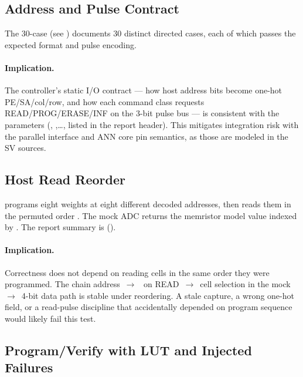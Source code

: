 \subsection{Address and Pulse Contract}
\label{sec:analysis-addr-contract}

The 30-case  (see
) documents 30 distinct directed cases, each
of which passes the expected  format and pulse
encoding.

\paragraph{Implication.}
The controller's static I/O contract --- how host address bits become
one-hot PE/SA/col/row, and how each command class requests
READ/PROG/ERASE/INF on the 3-bit pulse bus --- is consistent with the
 parameters (, ,\ldots, listed
in the report header). This mitigates integration risk with the
parallel interface and ANN core pin semantics, as those are modeled in
the SV sources.

\subsection{Host Read Reorder}
\label{sec:analysis-read-reorder}

 programs eight weights at eight
different decoded addresses, then reads them in the permuted order
. The mock ADC returns the memristor model value
indexed by . The report
summary is  ().

\paragraph{Implication.}
Correctness does not depend on reading cells in the same order they
were programmed. The chain
address~\(\rightarrow\)~ on READ~\(\rightarrow\)~cell
selection in the mock~\(\rightarrow\)~4-bit data path is stable under
reordering. A stale  capture, a wrong one-hot
field, or a read-pulse discipline that accidentally depended on program
sequence would likely fail this test.

\subsection{Program/Verify with LUT and Injected Failures}
\label{sec:analysis-prog-verify}

